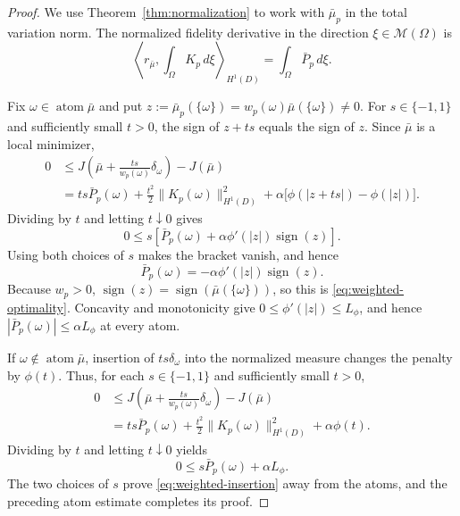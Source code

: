 \documentclass[11pt]{amsart}
\theoremstyle{definition}
\theoremstyle{remark}
\DeclareMathOperator{\atom}{atom}
\DeclareMathOperator{\sign}{sign}
\begin{document}
\begin{proof}
We use Theorem~\ref{thm:normalization} to work with
$\bar\mu_p$ in the total variation norm. The normalized fidelity derivative
in the direction $\xi\in\mathcal M(\Omega)$ is
\begin{equation*}
	\left\langle r_{\bar\mu},
	\int_\Omega K_p\,d\xi\right\rangle_{H^1(D)}
	=\int_\Omega\bar P_p\,d\xi.
\end{equation*}

Fix $\omega\in\atom\bar\mu$ and put
$z:=\bar\mu_p(\{\omega\})=w_p(\omega)\bar\mu(\{\omega\})\ne0$.
For $s\in\{-1,1\}$ and sufficiently small $t>0$, the sign of $z+ts$
equals the sign of $z$. Since $\bar\mu$ is a local minimizer,
\begin{align*}
	0&\le J\!\left(\bar\mu+\frac{ts}{w_p(\omega)}\delta_\omega\right)
	-J(\bar\mu)\\
	&=ts\bar P_p(\omega)+\frac{t^2}{2}\|K_p(\omega)\|_{H^1(D)}^2
	+\alpha\bigl[\phi(|z+ts|)-\phi(|z|)\bigr].
\end{align*}
Dividing by $t$ and letting $t\downarrow0$ gives
\begin{equation*}
	0\le s\left[
	\bar P_p(\omega)+\alpha\phi'(|z|)\sign(z)
	\right].
\end{equation*}
Using both choices of $s$ makes the bracket vanish, and hence
\begin{equation*}
	\bar P_p(\omega)
	=-\alpha\phi'(|z|)\sign(z).
\end{equation*}
Because $w_p>0$, $\sign(z)=\sign(\bar\mu(\{\omega\}))$, so this is
\eqref{eq:weighted-optimality}. Concavity and monotonicity give
$0\le\phi'(|z|)\le L_\phi$, and hence
$|\bar P_p(\omega)|\le\alpha L_\phi$ at every atom.

If $\omega\notin\atom\bar\mu$, insertion of $ts\delta_\omega$ into the
normalized measure changes the penalty by $\phi(t)$. Thus, for each
$s\in\{-1,1\}$ and sufficiently small $t>0$,
\begin{align*}
	0&\le J\!\left(\bar\mu+\frac{ts}{w_p(\omega)}\delta_\omega\right)
	-J(\bar\mu)\\
	&=ts\bar P_p(\omega)+\frac{t^2}{2}\|K_p(\omega)\|_{H^1(D)}^2
	+\alpha\phi(t).
\end{align*}
Dividing by $t$ and letting $t\downarrow0$ yields
\begin{equation*}
	0\le s\bar P_p(\omega)+\alpha L_\phi.
\end{equation*}
The two choices of $s$ prove \eqref{eq:weighted-insertion} away from the
atoms, and the preceding atom estimate completes its proof.


\end{proof}
\end{document}
